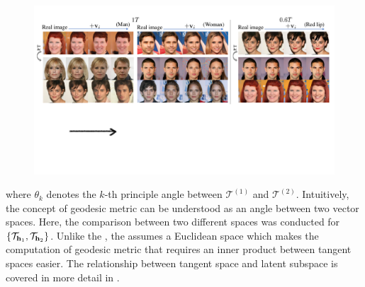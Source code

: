 \begin{figure}[!b]
    \centering
    \includegraphics[width=1\linewidth]
    {figure/parallel_tmp.pdf}
    \caption{\textbf{}
    }
    \label{fig:parallel}
\end{figure}



where {$\theta_k$} denotes the $k$-th principle angle between $\mathcal{T}^{(1)}$ and $\mathcal{T}^{(2)}$. Intuitively, the concept of geodesic metric can be understood as an angle between two vector spaces.
{Here, the comparison between two different spaces was conducted for 
$\{\mathcal{T}_{\mathbf{h}_1}, \mathcal{T}_{\mathbf{h}_2} \}$. 
Unlike the \exspace{}, the \ehspace{} assumes a Euclidean space which makes the computation of geodesic metric that requires an inner product between tangent spaces easier. 
The relationship between tangent space and latent subspace is covered in more detail in .
}


